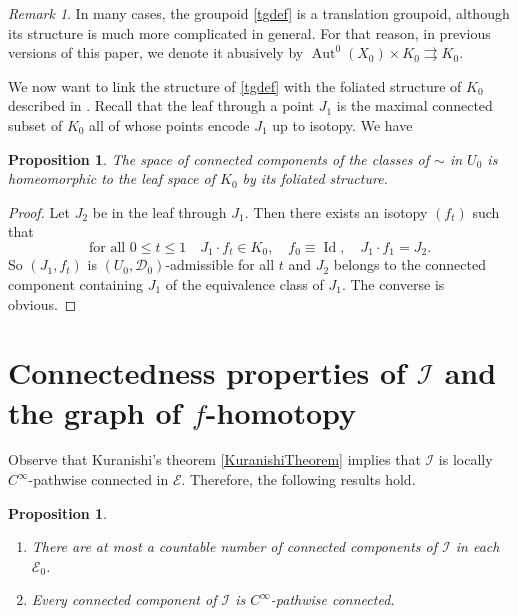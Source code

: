 \documentclass[JEP,XML,SOM,Unicode]{cedram}
\let\mathcal\mathscr
\DeclareMathOperator{\Aut}{Aut}
\DeclareMathOperator{\Id}{Id}
\theoremstyle{plain}
\newtheorem{proposition}[theorem]{Proposition}
\theoremstyle{definition}
\theoremstyle{remark}
\newtheorem{remark}[theorem]{Remark}
\numberwithin{equation}{section}
\newcommand{\Azero}{\Aut^0(X_0)}
\newcommand{\cI}{\mathcal{I}}
\begin{document}
\begin{remark}
\label{localactionbefore}
In many cases, the groupoid \eqref{tgdef} is a translation groupoid, although its structure is much more complicated in general. For that reason, in previous versions of this paper, we denote it abusively by $\Azero\times K_0\rightrightarrows K_0$.
\end{remark}

We now want to link the structure of \eqref{tgdef} with the foliated structure of $K_0$ \hbox{described} in \cite{ENS}. Recall that the leaf through a point $J_1$ is the maximal connected subset of $K_0$ all of whose points encode $J_1$ up to isotopy. We have
\begin{proposition}
\label{autfol}
The space of connected components of the classes of $\sim$ in $U_0$ is homeomorphic to the leaf space of $K_0$ by its foliated structure.
\end{proposition}
\begin{proof}
Let $J_2$ be in the leaf through $J_1$. Then there exists an isotopy $(f_t)$ such that
\begin{equation*}
\text{for all } 0\leq t\leq 1\quad J_1\cdot f_t\in K_0,\quad f_0\equiv \Id,\quad J_1\cdot f_1=J_2.
\end{equation*}
So $(J_1,f_t)$ is $(U_0,\mathcal D_0)$-admissible for all $t$ and $J_2$ belongs to the connected component containing $J_1$ of the equivalence class of $J_1$. The converse is obvious.
\end{proof}

\section{Connectedness properties of \texorpdfstring{$\cI$}{I} and the graph of \texorpdfstring{$f$}{f}-homotopy}
\label{f-homotopy}

Observe that Kuranishi's theorem \ref{KuranishiTheorem} implies that $\cI$ is locally $C^\infty$-pathwise connected in $\mathcal E$. Therefore, the following results hold.

\skpt
\begin{proposition}
\label{countable1}
\begin{enumerate}
\item
There are at most a countable number of connected components of $\cI$ in each~$\mathcal E_0$.
\item
Every connected component of $\cI$ is $C^\infty$-pathwise connected.
\end{enumerate}
\end{proposition}
\end{document}

